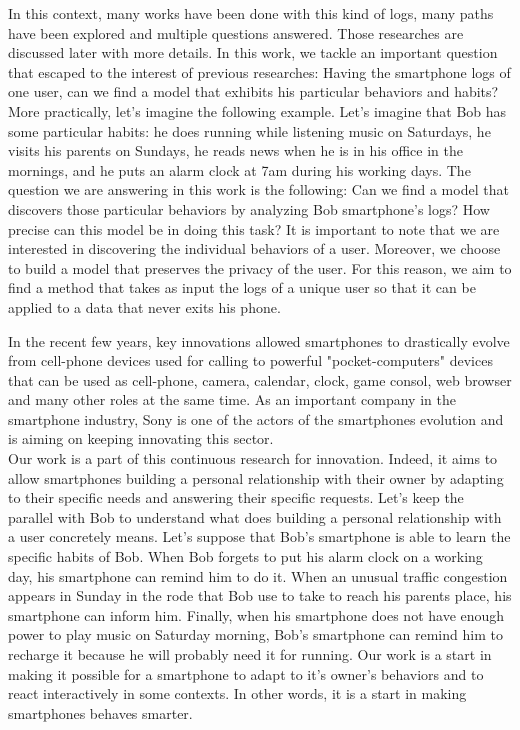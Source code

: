 In this context, many works have been done with this kind of logs, many paths have been explored and multiple questions answered. Those researches are discussed later with more details.
In this work, we tackle an important question that escaped to the interest of previous researches: Having the smartphone logs of one user, can we find a model that exhibits his particular behaviors and habits? More practically, let's imagine the following example. Let's imagine that Bob has some particular habits: he does running while listening music on Saturdays, he visits his parents on Sundays, he reads news when he is in his office in the mornings, and he puts an alarm clock at 7am during his working days. The question we are answering in this work is the following: Can we find a model that discovers those particular behaviors by analyzing Bob smartphone's logs? How precise can this model be in doing this task?
It is important to note that we are interested in discovering the individual behaviors of a user. Moreover, we choose to build a model that preserves the privacy of the user. For this reason, we aim to find a method that takes as input the logs of a unique user so that it can be applied to a data that never exits his phone. \par

In the recent few years, key innovations allowed smartphones to drastically evolve from cell-phone devices used for calling to powerful "pocket-computers" devices that can be used as cell-phone, camera, calendar, clock, game consol, web browser and many other roles at the same time. As an important company in the smartphone industry, Sony is one of the actors of the smartphones evolution and is aiming on keeping innovating this sector. 
\\Our work is a part of this continuous research for innovation. Indeed, it aims to allow smartphones building a personal relationship with their owner by adapting to their specific needs and answering their specific requests. Let's keep the parallel with Bob to understand what does building a personal relationship with a user concretely means. Let's suppose that Bob's smartphone is able to learn the specific habits of Bob. When Bob forgets to put his alarm clock on a working day, his smartphone can remind him to do it. When an unusual traffic congestion appears in Sunday in the rode that Bob use to take to reach his parents place, his smartphone can inform him. Finally, when his smartphone does not have enough power to play music on Saturday morning, Bob's smartphone can remind him to recharge it because he will probably need it for running. Our work is a start in making it possible for a smartphone to adapt to it's owner's behaviors and to react interactively in some contexts. In other words, it is a start in making smartphones behaves smarter. \par

